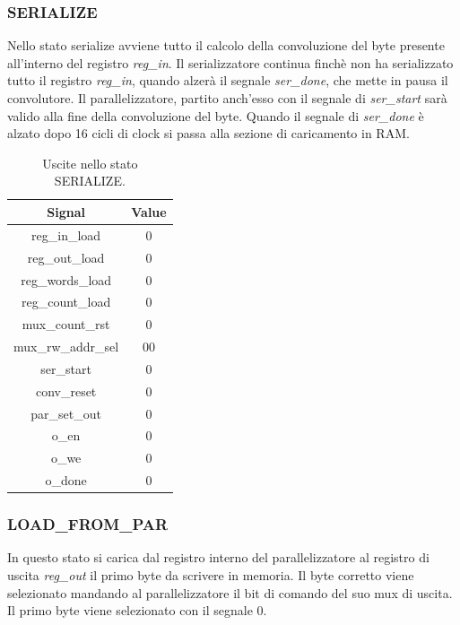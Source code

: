 \documentclass[a4paper]{report}
\begin{document}
\subsubsection{SERIALIZE}
Nello stato serialize avviene tutto il calcolo della convoluzione del byte presente all'interno del registro \textit{reg\_in}. Il serializzatore continua finchè non ha serializzato tutto il registro \textit{reg\_in}, quando alzerà il segnale \textit{ser\_done}, che mette in pausa il convolutore. Il parallelizzatore, partito anch'esso con il segnale di \textit{ser\_start} sarà valido alla fine della convoluzione del byte. Quando il segnale di \textit{ser\_done} è alzato dopo 16 cicli di clock si passa alla sezione di caricamento in RAM.
\begin{table}[H]
  \centering
  \begin{tabular}{||c | c||} 
    \hline
    Signal & Value \\
    \hline\hline
    reg\_in\_load & 0 \\
    reg\_out\_load & 0 \\
    reg\_words\_load & 0 \\
    reg\_count\_load & 0 \\
    mux\_count\_rst & 0 \\
    mux\_rw\_addr\_sel & 00 \\
    ser\_start & 0 \\
    conv\_reset & 0 \\
    par\_set\_out & 0 \\
    o\_en & 0 \\
    o\_we & 0 \\
    o\_done & 0 \\
   \hline
  \end{tabular}
  \caption{Uscite nello stato SERIALIZE.}
  \label{table:6}
\end{table}

\subsubsection{LOAD\_FROM\_PAR}
In questo stato si carica dal registro interno del parallelizzatore al registro di uscita \textit{reg\_out} il primo byte da scrivere in memoria. Il byte corretto viene selezionato mandando al parallelizzatore il bit di comando del suo mux di uscita. Il primo byte viene selezionato con il segnale 0.
\end{document}
